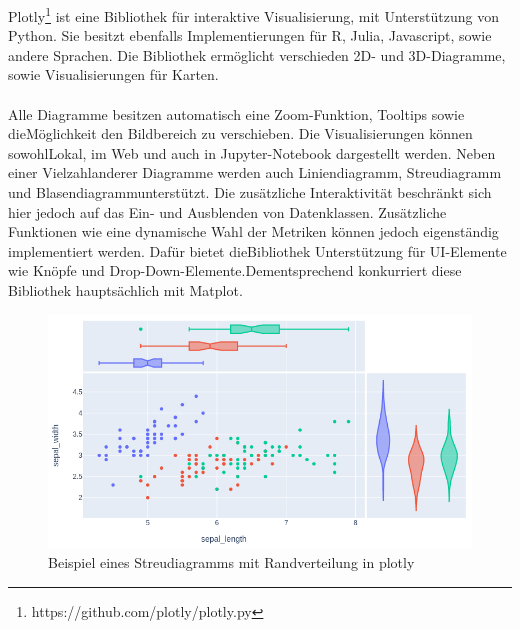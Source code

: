 Plotly\footnote{https://github.com/plotly/plotly.py} ist eine Bibliothek für interaktive Visualisierung, mit Unterstützung von Python. Sie besitzt ebenfalls Implementierungen für R, Julia, Javascript, sowie andere Sprachen. Die Bibliothek ermöglicht verschieden 2D- und 3D-Diagramme, sowie Visualisierungen für Karten.\\\\
\noindent Alle Diagramme besitzen automatisch eine Zoom-Funktion, Tooltips sowie die\linebreak Möglichkeit den Bildbereich zu verschieben. Die Visualisierungen können sowohl\linebreak Lokal, im Web und auch in Jupyter-Notebook dargestellt werden. Neben einer Vielzahl\linebreak anderer Diagramme werden auch Liniendiagramm, Streudiagramm und Blasendiagramm\linebreak unterstützt. Die zusätzliche Interaktivität beschränkt sich hier jedoch auf das Ein- und Ausblenden von Datenklassen. Zusätzliche Funktionen wie eine dynamische Wahl der Metriken können jedoch eigenständig implementiert werden. Dafür bietet die\linebreak Bibliothek Unterstützung für UI-Elemente wie Knöpfe und Drop-Down-Elemente.\linebreak Dementsprechend konkurriert diese Bibliothek hauptsächlich mit Matplot.

\begin{figure}[H]
    \centering
    \includegraphics[height=.6\textwidth]{images/plotly_example.png}
    \caption{Beispiel eines Streudiagramms mit Randverteilung in plotly\protect\footnotemark}
    \label{fig:example_plotly}
\end{figure}



